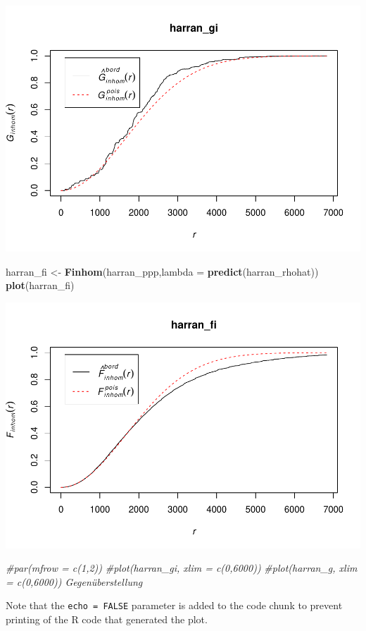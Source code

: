 \documentclass[]{article}
\newenvironment{Shaded}{\begin{snugshade}}{\end{snugshade}}
\newcommand{\KeywordTok}[1]{\textcolor[rgb]{0.13,0.29,0.53}{\textbf{{#1}}}}
\newcommand{\DataTypeTok}[1]{\textcolor[rgb]{0.13,0.29,0.53}{{#1}}}
\newcommand{\StringTok}[1]{\textcolor[rgb]{0.31,0.60,0.02}{{#1}}}
\newcommand{\CommentTok}[1]{\textcolor[rgb]{0.56,0.35,0.01}{\textit{{#1}}}}
\newcommand{\NormalTok}[1]{{#1}}
\begin{document}
\includegraphics{HarranPlain_files/figure-latex/unnamed-chunk-11-1.pdf}

\begin{Shaded}
\begin{Highlighting}[]
\NormalTok{harran_fi <-}\StringTok{ }\KeywordTok{Finhom}\NormalTok{(harran_ppp,}\DataTypeTok{lambda =} \KeywordTok{predict}\NormalTok{(harran_rhohat))}
\KeywordTok{plot}\NormalTok{(harran_fi)}
\end{Highlighting}
\end{Shaded}

\includegraphics{HarranPlain_files/figure-latex/unnamed-chunk-11-2.pdf}

\begin{Shaded}
\begin{Highlighting}[]
\CommentTok{#par(mfrow = c(1,2))}
\CommentTok{#plot(harran_gi, xlim = c(0,6000))}
\CommentTok{#plot(harran_g, xlim = c(0,6000))      Gegenüberstellung }
\end{Highlighting}
\end{Shaded}

Note that the \texttt{echo\ =\ FALSE} parameter is added to the code
chunk to prevent printing of the R code that generated the plot.
\end{document}
